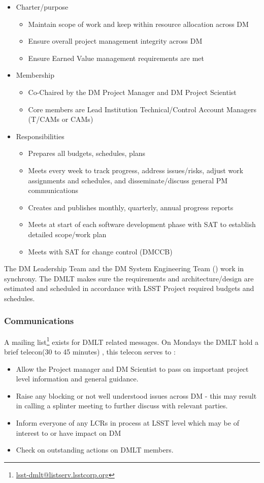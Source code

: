 \begin{itemize}
\item Charter/purpose
	\begin{itemize}
	\item Maintain scope of work and keep within resource allocation across DM
	\item Ensure overall project management integrity across DM
	\item Ensure Earned Value management requirements are met
	\end{itemize}
\item Membership
	\begin{itemize}
	\item Co-Chaired by the DM Project Manager  and  DM Project Scientist
	\item Core members are Lead Institution Technical/Control Account Managers (T/CAMs or CAMs)
	\end{itemize}
\item Responsibilities
	\begin{itemize}
	\item Prepares all budgets, schedules, plans
	\item Meets every week to track progress, address issues/risks, adjust work assignments and schedules, and disseminate/discuss general PM communications
	\item Creates and publishes monthly, quarterly, annual progress reports
	\item Meets at start of each software development phase with SAT to establish detailed scope/work plan
	\item Meets with SAT for change control (DMCCB)
	\end{itemize}
\end{itemize}

The DM Leadership Team and the DM System Engineering Team () work in synchrony. 
The DMLT makes sure the requirements and architecture/design are estimated and scheduled in accordance with LSST Project required budgets and schedules.

 \subsubsection{Communications} 
 A mailing list\footnote{\url{lsst-dmlt@listserv.lsstcorp.org}} exists for DMLT related messages. 
 On Mondays the DMLT hold a brief telecon(30 to 45 minutes) , this telecon serves to :
\begin{itemize}
\item Allow the Project manager and DM Scientist  to pass on important project level information and general guidance. 
\item Raise any blocking or not well understood issues across DM - this may result in calling a splinter meeting to further discuss with relevant parties.
\item Inform everyone of any LCRs in process at LSST level which may be of interest to or  have impact on DM
\item Check on outstanding actions on DMLT members. 
\end{itemize}

